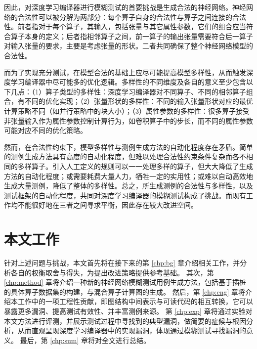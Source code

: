 因此，对深度学习编译器进行模糊测试的首要挑战是生成合法的神经网络。神经网络的合法性可以被分解为两部分：每个算子自身的合法性与算子之间连接的合法性。前者指对于每个算子，其输入，包括张量与其它属性参数，它们的组合应当符合算子本身的定义；后者指相邻算子之间，前一算子的输出张量需要符合后一算子对输入张量的要求，主要是考虑张量的形状。二者共同确保了整个神经网络模型的合法性。

而为了实现充分测试，在模型合法的基础上应尽可能提高模型多样性，从而触发深度学习编译器中尽可能多的优化逻辑。多样性的不同维度及各自的意义至少包含以下几点：（1）算子类型的多样性：深度学习编译器对不同算子、不同的相邻算子组合，有不同的优化实现；（2）张量形状的多样性：不同的输入张量形状对应的最优计算策略不同（如并行策略中的块大小）；（3）属性参数的多样性：很多算子接受非张量输入作为属性参数控制计算行为，如卷积算子中的步长，而不同的属性参数可能对应不同的优化策略。

然而，在合法性约束下，模型多样性与测例生成方法的自动化程度存在矛盾。简单的测例生成方法具有高度的自动化程度，但难以处理合法性约束条件复杂而各不相同的多样算子。引入人工定义的规则可以一一处理多样的算子，但大大降低了生成方法的自动化程度；或需要耗费大量人力，牺牲一定的实用性；或难以自动高效地生成大量测例，降低了整体的多样性。总之，所生成测例的合法性与多样性，以及测试框架的自动化程度，共同对深度学习编译器的模糊测试构成了挑战。而现有工作均不能很好地在三者之间寻求平衡，因此存在较大改进空间。

\section{本文工作}
针对上述问题与挑战，本文首先将在接下来的第 \ref{chp:bg} 章介绍相关工作，并分析各自的权衡取舍与得失，为提出改进策略提供参考基础。
其次，第 \ref{chp:method} 章将介绍一种新的神经网络模糊测试用例生成方法，包括基于插桩的具体算子数据集的构建，与混合算子计算图的生成。
然后，第 \ref{chp:eng} 章将介绍本工作中的一项工程性贡献，即图结构中间表示与可读代码的相互转换，它可以暴露更多漏洞、提高测试有效性、并丰富测例来源。
第 \ref{chp:exp} 章将通过实验对本文方法进行评测，并展示测试过程中寻找到的典型漏洞，做简要的症候与根因分析，从而直观呈现深度学习编译器中的实现漏洞，体现通过模糊测试寻找漏洞的意义。
最后，第 \ref{chp:sum} 章将对全文进行总结。

